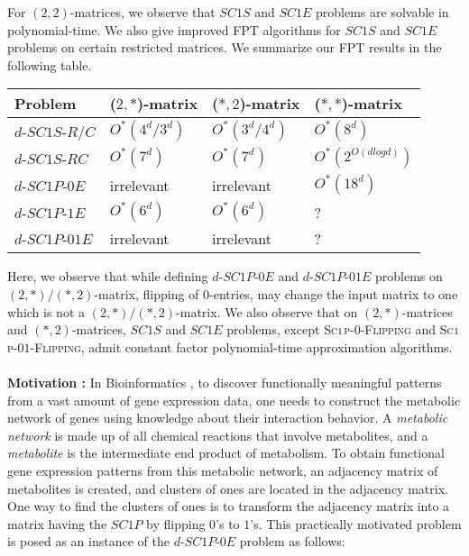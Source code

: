 \documentclass[review, 1p]{elsarticle}
\begin{document}
For $(2,2)$-matrices, we observe that $SC1S$ and $SC1E$ problems are solvable in polynomial-time. We also give improved FPT algorithms for $SC1S$ and $SC1E$ problems on certain restricted matrices. We summarize our FPT results in the following table.
\begin{center}
\begin{tabular}{ |p{3.3cm}|p{2.80cm}|p{2.80cm}|p{2.80cm}|}
 \hline
 \color{black}\textbf{Problem} &\color{black}\textbf{($2,*$)-matrix} &\color{black}\textbf{($*,2$)-matrix}&\color{black}\textbf{($*,*$)-matrix}\\
 \hline 
  $d$-$SC1S$-$R/C$ &$O^{*}(4^{d}/3^{d})$ & $O^{*}(3^{d}/4^{d})$ & $O^{*}(8^{d})$\\
 $d$-$SC1S$-$RC$ &$O^{*}(7^{d})$&$O^{*}(7^{d})$&$O^{*}(2^{O(dlogd)})$\\
 $d$-$SC1P$-$0E$ &irrelevant&irrelevant&$O^{*}(18^{d})$\\
 $d$-$SC1P$-$1E$ &$O^{*}(6^{d})$&$O^{*}(6^{d})$&?\\ 
 $d$-$SC1P$-$01E$ &irrelevant&irrelevant&?\\
  \hline
\end{tabular}
\end{center}
\noindent Here, we observe that while defining $d$-$SC1P$-$0E$ and $d$-$SC1P$-$01E$ problems on $(2,*)/(*,2)$-matrix, flipping of $0$-entries, may change the input matrix to one which is not a $(2,*)/(*,2)$-matrix. We also observe that on $(2,*)$-matrices and $(*,2)$-matrices, $SC1S$ and $SC1E$ problems, except \textsc{Sc$ \mathsmaller 1$p-$0$-Flipping} and \textsc{Sc$ \mathsmaller 1$p-$01$-Flipping}, admit constant factor polynomial-time approximation algorithms. \\\\
\textbf{Motivation : } In Bioinformatics \cite{konig2006discovering}, to discover functionally meaningful patterns from a vast amount of gene expression data, one needs to construct the metabolic network of genes using knowledge about their interaction behavior.  A \textit{metabolic network} is made up of all chemical reactions that involve metabolites, and a \textit{metabolite} is the intermediate end product of metabolism. To obtain functional gene expression patterns from this metabolic network, an adjacency matrix of metabolites is created, and clusters of ones are located in the adjacency matrix. One way to find the clusters of ones is to transform the adjacency matrix into a matrix having the $SC1P$ by flipping $0$'s to $1$'s. This practically motivated problem is posed as an instance of the $d$-$SC1P$-$0E$ problem as follows: \\\\
\end{document}
